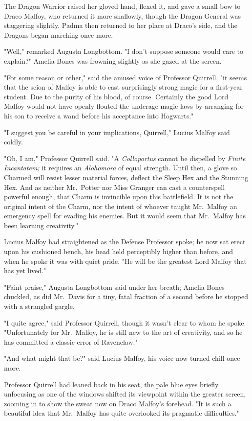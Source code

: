 The Dragon Warrior raised her gloved hand, flexed it, and gave a small bow to
Draco Malfoy, who returned it more shallowly, though the Dragon General was
staggering slightly. Padma then returned to her place at Draco's side, and the
Dragons began marching once more.

"Well," remarked Augusta Longbottom. "I don't suppose someone would care to
explain?" Amelia Bones was frowning slightly as she gazed at the screen.

"For some reason or other," said the amused voice of Professor Quirrell, "it
seems that the scion of Malfoy is able to cast surprisingly strong magic for a
first-year student. Due to the purity of his blood, of course. Certainly the
good Lord Malfoy would not have openly flouted the underage magic laws by
arranging for his son to receive a wand before his acceptance into Hogwarts."

"I suggest you be careful in your implications, Quirrell," Lucius Malfoy said
coldly.

"Oh, I am," Professor Quirrell said. "A \emph{Colloportus} cannot be dispelled
by \emph{Finite Incantatem;} it requires an \emph{Alohomora} of equal strength.
Until then, a glove so Charmed will resist lesser material forces, deflect the
Sleep Hex and the Stunning Hex. And as neither Mr.~Potter nor Miss Granger can
cast a counterspell powerful enough, that Charm is invincible upon this
battlefield. It is not the original intent of the Charm, nor the intent of
whoever taught Mr.~Malfoy an emergency spell for evading his enemies. But it
would seem that Mr.~Malfoy has been learning creativity."

Lucius Malfoy had straightened as the Defense Professor spoke; he now sat erect
upon his cushioned bench, his head held perceptibly higher than before, and
when he spoke it was with quiet pride. "He will be the greatest Lord Malfoy
that has yet lived."

"Faint praise," Augusta Longbottom said under her breath; Amelia Bones
chuckled, as did Mr.~Davis for a tiny, fatal fraction of a second before he
stopped with a strangled gargle.

"I quite agree," said Professor Quirrell, though it wasn't clear to whom he
spoke. "Unfortunately for Mr.~Malfoy, he is still new to the art of creativity,
and so he has committed a classic error of Ravenclaw."

"And what might that be?" said Lucius Malfoy, his voice now turned chill once
more.

Professor Quirrell had leaned back in his seat, the pale blue eyes briefly
unfocusing as one of the windows shifted its viewpoint within the greater
screen, zooming in to show the sweat now on Draco Malfoy's forehead. "It is
such a beautiful idea that Mr.~Malfoy has quite overlooked its pragmatic
difficulties."


